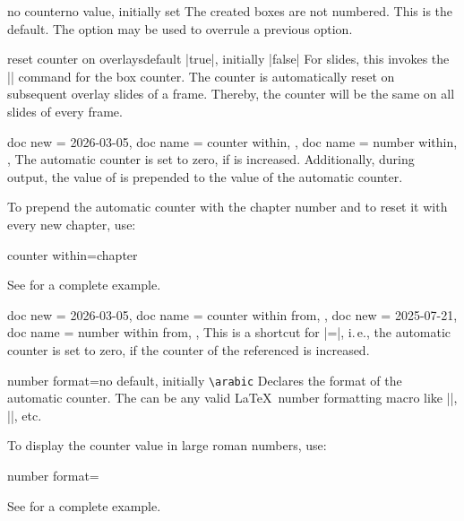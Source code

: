 \begin{newTcbKey}{no counter}{}{no value, initially set}
The created boxes are not numbered. This is the default. The option may
be used to overrule a previous option.
\end{newTcbKey}


\begin{newTcbKey}[][doc new=2019-10-18]{reset counter on overlays}{}{default |true|, initially |false|}
For  slides, this invokes the |\resetcounteronoverlays| command
for the box counter. The counter is automatically reset on subsequent
overlay slides of a frame.
Thereby, the counter will be the same on all slides of every frame.
\end{newTcbKey}


\clearpage
\begin{newTcbKeys}[
    doc parameter   = {=\meta{counter}},
    doc description = {no default, initially unset},
  ]{
    {
      doc new         = {2026-03-05},
      doc name        = counter within,
    },
    {
      doc name        = number within,
    },
  }
The automatic counter is set to zero, if  is increased.
Additionally, during output, the value of  is prepended to the value of
the automatic counter.\par
To prepend the automatic counter with the chapter number and to reset it
with every new chapter, use:
\begin{dispListing}
counter within=chapter
\end{dispListing}
See  for a complete example.
\end{newTcbKeys}


\begin{newTcbKeys}[
    doc parameter   = {=\meta{tcolorbox}},
    doc description = {no default, initially unset},
  ]{
    {
      doc new         = {2026-03-05},
      doc name        = counter within from,
    },
    {
      doc new         = {2025-07-21},
      doc name        = number within from,
    },
  }
This is a shortcut for |=|,
i.\,e., the automatic counter is set to zero, if the counter of the referenced  is increased.
\end{newTcbKeys}


\begin{newTcbKey}{number format}{=}{no default, initially \texttt{\textbackslash arabic}}
Declares the format of the automatic counter. The  can be
any valid \LaTeX\ number formatting macro like |\arabic|, |\roman|, etc.\par
To display the counter value in large roman numbers, use:
\begin{dispListing}
number format=\Roman
\end{dispListing}
See  for a complete example.
\end{newTcbKey}


